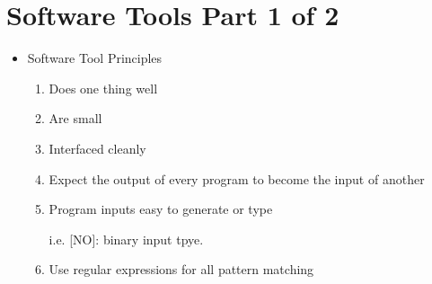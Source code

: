 \documentclass[12pt]{article}
\begin{document}
\bigskip

\section*{Software Tools Part 1 of 2}
\begin{itemize}
    \item Software Tool Principles
    \begin{enumerate}[1.]
        \item Does one thing well
        \item Are small
        \item Interfaced cleanly
        \item Expect the output of every program to become the input of another
        \item Program inputs easy to generate or type

        \bigskip

        i.e. [NO]: binary input tpye.
        \item Use regular expressions for all pattern matching
    \end{enumerate}
\end{itemize}

\bigskip
\end{document}
